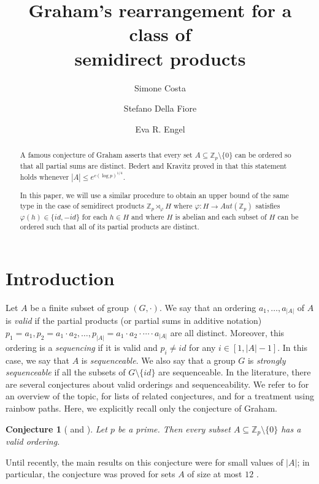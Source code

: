 \documentclass[11pt]{amsart}
\title{Graham's rearrangement for a class of\\semidirect products}
\author[]{Simone Costa}
\author[]{Stefano Della Fiore}
\author[]{Eva R. Engel}
\newtheorem{conjecture}[theorem]{Conjecture}
\theoremstyle{definition}
\begin{document}
\begin{abstract}
A famous conjecture of Graham asserts that every set $A \subseteq \mathbb{Z}_p \setminus \{0\}$ can be ordered so that all partial sums are distinct. Bedert and Kravitz proved in \cite{BK} that this statement holds whenever $|A| \leq e^{c(\log p)^{1/4}}$.

In this paper,  we will use a similar procedure to obtain an upper bound of the same type in the case of semidirect products $\mathbb{Z}_p \rtimes_{\varphi} H$ where $\varphi: H \to Aut(\mathbb{Z}_p)$ satisfies $\varphi(h) \in \{id, -id\}$ for each $h \in H$ and where $H$ is abelian and each subset of $H$ can be ordered such that all of its partial products are distinct.
\end{abstract}

\maketitle

\section{Introduction}
Let $A$ be a finite subset of group $(G,\cdot)$.  We say that an ordering $a_1, \ldots, a_{|A|}$ of $A$ is \emph{valid} if the partial products (or partial sums in additive notation) $p_1=a_1, p_2=a_1\cdot a_2, \ldots, p_{|A|}=a_1\cdot a_2\cdot\cdots\cdot a_{|A|}$ are all distinct. Moreover, this ordering is a \emph{sequencing} if it is valid and $p_i\not=id$ for any $i\in [1,|A|-1]$. In this case, we say that $A$ is \emph{sequenceable}. We also say that a group $G$ is \emph{strongly sequenceable} if all the subsets of $G \setminus \{id\}$ are sequenceable. In the literature, there are several conjectures about valid orderings and sequenceability. We refer to  \cite{CMPP18, OllisSurvey, PD} for an overview of the topic, \cite{AKP, AL20, ADMS16, CDOR} for lists of related conjectures, and \cite{BFMPY} for a treatment using rainbow paths. Here, we explicitly recall only the conjecture of Graham.

\begin{conjecture}[\cite{GR} and \cite{EG}]\label{conj:main}
Let $p$ be a prime.  Then every subset $A \subseteq \mathbb{Z}_p \setminus\{0\}$ has a valid ordering.
\end{conjecture}
Until recently, the main results on this conjecture were for small values of $|A|$; in particular, the conjecture was proved for sets $A$ of size at most $12$ \cite{CDOR}.
\end{document}
